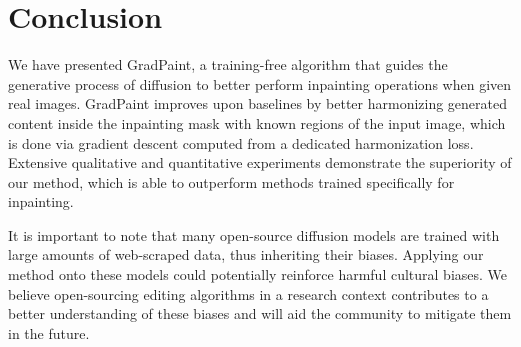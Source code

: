 










%

\section{Conclusion}

We have presented GradPaint, a training-free algorithm that guides the generative process of diffusion to better perform inpainting operations when given real images. GradPaint improves upon baselines by better harmonizing generated content inside the inpainting mask with known regions of the input image, which is done via gradient descent computed from a dedicated harmonization loss. Extensive qualitative and quantitative experiments demonstrate the superiority of our method, which is able to outperform methods trained specifically for inpainting.

It is important to note that many open-source diffusion models are trained with large amounts of web-scraped data, thus inheriting their biases. Applying our method onto these models could potentially reinforce harmful cultural biases. We believe open-sourcing editing algorithms in a research context contributes to a better understanding of these biases and will aid the community to mitigate them in the future.


%